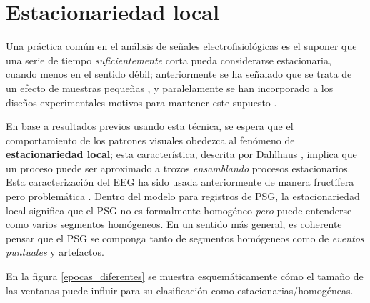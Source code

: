 
\section{Estacionariedad local}
\label{sec:est_local}

Una práctica común en el análisis de señales electrofisiológicas es el suponer que una serie de 
tiempo \textit{suficientemente} corta pueda considerarse estacionaria, cuando menos en el sentido
débil; anteriormente se ha señalado que se trata de un efecto de muestras pequeñas \cite{Melard89},
y paralelamente se han incorporado a los diseños experimentales motivos para mantener este supuesto
\cite{Kaiser00}.

En base a resultados previos usando esta técnica, se espera que el comportamiento de los patrones 
visuales obedezca al fenómeno de \textbf{estacionariedad local}; esta característica, descrita por 
Dahlhaus \cite{Dahlhaus97}, implica que un proceso puede ser aproximado a trozos 
\textit{ensamblando} procesos estacionarios.
%
Esta caracterización del EEG ha sido usada anteriormente de manera fructífera pero problemática
\cite{Barlow85,Kaplan99}.
%
Dentro del modelo para registros de PSG, la estacionariedad local significa que el PSG no es
formalmente homogéneo \textit{pero} puede entenderse como varios segmentos homógeneos. En un
sentido más general, es coherente pensar que el PSG se componga tanto de segmentos homógeneos
como de \textit{eventos puntuales} y artefactos.

En la figura \ref{epocas_diferentes} se muestra esquemáticamente cómo el tamaño
de las ventanas puede influir para su clasificación como estacionarias/homogéneas.

